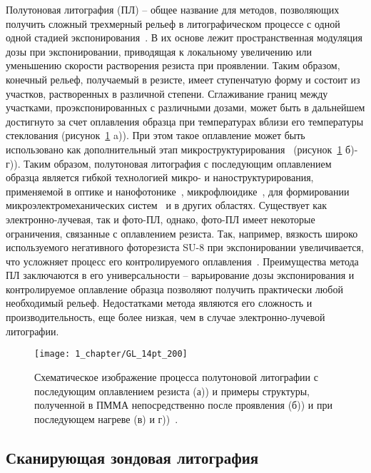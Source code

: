 Полутоновая литография (ПЛ) -- общее название для методов, позволяющих получить сложный трехмерный рельеф в литографическом процессе с одной одной стадией экспонирования~\cite{GL_general}. В их основе лежит пространственная модуляция дозы при экспонировании, приводящая к локальному увеличению или уменьшению скорости растворения резиста при проявлении. Таким образом, конечный рельеф, получаемый в резисте, имеет ступенчатую форму и состоит из участков, растворенных в различной степени. Сглаживание границ между участками, проэкспонированных с различными дозами, может быть в дальнейшем достигнуто за счет оплавления образца при температурах вблизи его температуры стеклования (рисунок~\ref{fig:GL} a)). При этом такое оплавление может быть использовано как дополнительный этап микроструктурирования~\cite{Kirchner_reflow} (рисунок~\ref{fig:GL} б)-г)). Таким образом, полутоновая литография с последующим оплавлением образца является гибкой технологией микро- и наноструктурирования, применяемой в оптике и нанофотонике~\cite{GL_optics}, микрофлюидике~\cite{GL_microfluidics}, для формировании микроэлектромеханических систем~\cite{GL_MEMS} и в других областях. Существует как электронно-лучевая, так и фото-ПЛ, однако, фото-ПЛ имеет некоторые ограничения, связанные с оплавлением резиста. Так, например, вязкость широко используемого негативного фоторезиста SU-8 при экспонировании увеличивается, что усложняет процесс его контролируемого оплавления~\cite{Kirchner_GL_review}. Преимущества метода ПЛ заключаются в его универсальности -- варьирование дозы экспонирования и контролируемое оплавление образца позволяют получить практически любой необходимый рельеф. Недостатками метода являются его сложность и производительность, еще более низкая, чем в случае электронно-лучевой литографии.

\begin{figure}[t]
	\centering
	\texttt{[image: 1\_chapter/GL\_14pt\_200]}
	\vspace{1em}
	\caption{Схематическое изображение процесса полутоновой литографии с последующим оплавлением резиста (а)) и примеры структуры, полученной в ПММА непосредственно после проявления (б)) и при последующем нагреве (в) и г))~\cite{Kirchner_reflow}.}
	\label{fig:GL}
\end{figure}


\subsection{Сканирующая зондовая литография}


